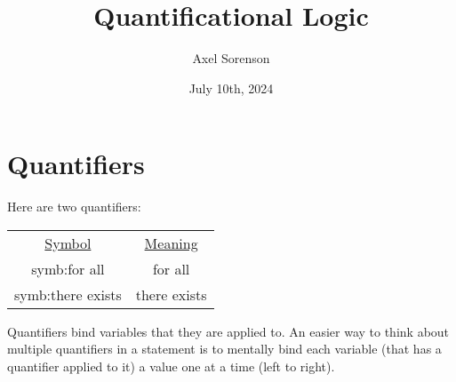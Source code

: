 \documentclass{article}
\title{Quantificational Logic}
\author{Axel Sorenson}
\date{July 10th, 2024}
\begin{document}
\maketitle

\section{Quantifiers}
Here are two quantifiers:
\begin{center}
\begin{tabular}{@{}cc@{}}
	\underline{Symbol} & \underline{Meaning} \\
	\gls{symb:for all} & for all \\
	\gls{symb:there exists} & there exists\\
\end{tabular}
\end{center}
Quantifiers bind variables that they are applied to. An easier way to think about multiple quantifiers in a statement is to mentally bind each variable (that has a quantifier applied to it) a value one at a time (left to right).

\clearpage
\printglossary[type=\acronymtype,style=long]  %
\printglossary[type=symbolslist,style=long]   %
\printglossary[type=main]                     %
\end{document}
